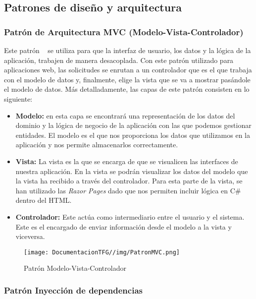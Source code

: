 \subsection{Patrones de diseño y arquitectura}

\subsubsection{Patrón de Arquitectura MVC (Modelo-Vista-Controlador)}
Este patrón ~\cite{patronmvc:latex} se utiliza para que la interfaz de usuario, los datos y la lógica de la aplicación, trabajen de manera desacoplada. Con este patrón utilizado para aplicaciones web, las solicitudes se enrutan a un controlador que es el que trabaja con el modelo de datos y, finalmente, elige la vista que se va a mostrar pasándole el modelo de datos. Más detalladamente, las capas de este patrón consisten en lo siguiente:

\begin{itemize}
    \item \textbf{Modelo:} en esta capa se encontrará una representación de los datos del dominio y la lógica de negocio de la aplicación con las que podemos gestionar entidades. El modelo es el que nos proporciona los datos que utilizamos en la aplicación y nos permite almacenarlos correctamente.
    \item \textbf{Vista:} La vista es la que se encarga de que se visualicen las interfaces de nuestra aplicación. En la vista se podrán visualizar los datos del modelo que la vista ha recibido a través del controlador.
    Para esta parte de la vista, se han utilizado las \textit{Razor Pages} dado que nos permiten incluir lógica en C\# dentro del HTML.
    \item \textbf{Controlador:} Este actúa como intermediario entre el usuario y el sistema. Este es el encargado de enviar información desde el modelo a la vista y viceversa.
\end{itemize}

\begin{figure}[H]
    \centering
    \texttt{[image: DocumentacionTFG//img/PatronMVC.png]}
    \caption{Patrón Modelo-Vista-Controlador ~\cite{apmvc:latex}}
\end{figure}

\subsubsection{Patrón Inyección de dependencias}


